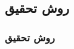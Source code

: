 \label{study_necessity}

\subsection{روش تحقیق}
\begin{frame}
\frametitle{روش تحقیق}



\end{frame}
